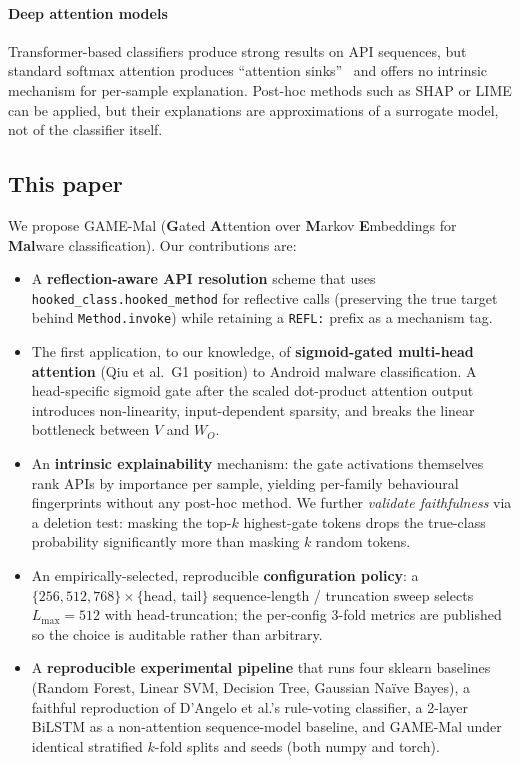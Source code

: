 \paragraph{Deep attention models} Transformer-based classifiers
produce strong results on API sequences, but standard softmax attention
produces ``attention sinks''~\cite{qiu2025gated} and offers no intrinsic
mechanism for per-sample explanation. Post-hoc methods such as
SHAP or LIME can be applied, but their explanations are approximations
of a surrogate model, not of the classifier itself.

\subsection{This paper}

We propose GAME-Mal (\textbf{G}ated \textbf{A}ttention over
\textbf{M}arkov \textbf{E}mbeddings for \textbf{Mal}ware
classification). Our contributions are:

\begin{itemize}
  \item A \textbf{reflection-aware API resolution} scheme that uses
  \texttt{hooked\_class.hooked\_method} for reflective calls (preserving
  the true target behind \texttt{Method.invoke}) while retaining a
  \texttt{REFL:} prefix as a mechanism tag.

  \item The first application, to our knowledge, of
  \textbf{sigmoid-gated multi-head attention} (Qiu et al.\
  G1 position) to Android malware classification. A head-specific
  sigmoid gate after the scaled dot-product attention output introduces
  non-linearity, input-dependent sparsity, and breaks the linear
  bottleneck between $V$ and $W_O$.

  \item An \textbf{intrinsic explainability} mechanism: the gate
  activations themselves rank APIs by importance per sample, yielding
  per-family behavioural fingerprints without any post-hoc method.
  We further \emph{validate faithfulness} via a deletion test:
  masking the top-$k$ highest-gate tokens drops the true-class
  probability significantly more than masking $k$ random tokens.

  \item An empirically-selected, reproducible \textbf{configuration
  policy}: a $\{256, 512, 768\} \times \{$head, tail$\}$
  sequence-length / truncation sweep selects $L_{\max}{=}512$ with
  head-truncation; the per-config 3-fold metrics are published so
  the choice is auditable rather than arbitrary.

  \item A \textbf{reproducible experimental pipeline} that runs
  four sklearn baselines (Random Forest, Linear SVM, Decision Tree,
  Gaussian Naïve Bayes), a faithful reproduction of D'Angelo et al.'s
  rule-voting classifier, a 2-layer BiLSTM as a non-attention
  sequence-model baseline, and GAME-Mal under identical stratified
  $k$-fold splits and seeds (both numpy and torch).
\end{itemize}

